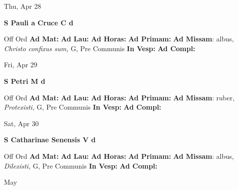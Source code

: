 \documentclass[10pt]{memoir}
\begin{document}
\begin{center}
\begin{minipage}{3.5in}
\vspace{2em}
\begin{center}Thu, Apr 28
\end{center}
\textbf{ \large S Pauli a Cruce C
\textnormal{\normalsize d}}

\begin{justify}Off Ord
\textbf{Ad Mat: }
\textbf{Ad Lau: }
\textbf{Ad Horas: }
\textbf{Ad Primam: }\textbf{Ad Missam}: albus, \textit{Christo confixus sum,} G, Pre Communis
\textbf{In Vesp: }
\textbf{Ad Compl: }
\end{justify}
\end{minipage}
\end{center}

\begin{center}
\begin{minipage}{3.5in}
\vspace{2em}
\begin{center}Fri, Apr 29
\end{center}
\textbf{ \large S Petri M
\textnormal{\normalsize d}}

\begin{justify}Off Ord
\textbf{Ad Mat: }
\textbf{Ad Lau: }
\textbf{Ad Horas: }
\textbf{Ad Primam: }\textbf{Ad Missam}: ruber, \textit{Protexisti,} G, Pre Communis
\textbf{In Vesp: }
\textbf{Ad Compl: }
\end{justify}
\end{minipage}
\end{center}

\begin{center}
\begin{minipage}{3.5in}
\vspace{2em}
\begin{center}Sat, Apr 30
\end{center}
\textbf{ \large S Catharinae Senensis V
\textnormal{\normalsize d}}

\begin{justify}Off Ord
\textbf{Ad Mat: }
\textbf{Ad Lau: }
\textbf{Ad Horas: }
\textbf{Ad Primam: }\textbf{Ad Missam}: albus, \textit{Dilexisti,} G, Pre Communis
\textbf{In Vesp: }
\textbf{Ad Compl: }
\end{justify}
\end{minipage}
\end{center}

\begin{center}
\pagebreak
\thispagestyle{empty}
{\Huge May}
\end{center}
                    
\end{document}
